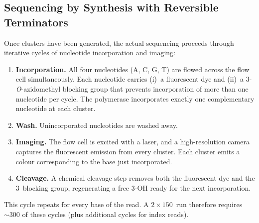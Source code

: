 \subsection{Sequencing by Synthesis with Reversible Terminators}

Once clusters have been generated, the actual sequencing proceeds through iterative cycles of nucleotide incorporation and imaging:

\begin{enumerate}[label=\textbf{Cycle step \arabic*:}, leftmargin=3.0cm]
  \item \textbf{Incorporation.} All four nucleotides (A, C, G, T) are flowed across the flow cell simultaneously. Each nucleotide carries (i)~a fluorescent dye and (ii)~a 3\textquotesingle-\textit{O}-azidomethyl blocking group that prevents incorporation of more than one nucleotide per cycle. The polymerase incorporates exactly one complementary nucleotide at each cluster.

  \item \textbf{Wash.} Unincorporated nucleotides are washed away.

  \item \textbf{Imaging.} The flow cell is excited with a laser, and a high-resolution camera captures the fluorescent emission from every cluster. Each cluster emits a colour corresponding to the base just incorporated.

  \item \textbf{Cleavage.} A chemical cleavage step removes both the fluorescent dye and the 3\textquotesingle\ blocking group, regenerating a free 3\textquotesingle-OH ready for the next incorporation.
\end{enumerate}

This cycle repeats for every base of the read. A $2 \times 150$\basepair\ run therefore requires ${\sim}300$ of these cycles (plus additional cycles for index reads).

